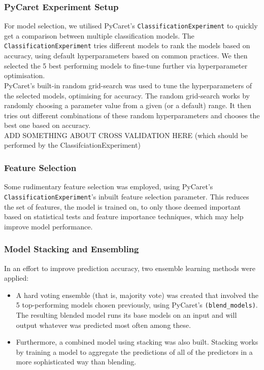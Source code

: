 \documentclass[a4paper,12pt]{article}
\begin{document}
\subsubsection{PyCaret Experiment Setup}
For model selection, we utilised PyCaret's \texttt{ClassificationExperiment} to quickly get a 
comparison between multiple classification models. The \texttt{ClassificationExperiment} tries 
different models to rank the models based on accuracy, using default hyperparameters based on common practices. 
We then selected the 5 best performing models to fine-tune further via hyperparameter optimisation. 
\\
PyCaret’s built-in random grid-search was used to tune the hyperparameters of the selected models, 
optimising for accuracy. The random grid-search works by 
randomly choosing a parameter value from a given (or a default) range. It then tries out different combinations
of these random hyperparameters and chooses the best one based on accuracy.
\\
ADD SOMETHING ABOUT CROSS VALIDATION HERE (which should be performed by the ClassifciationExperiment)


\subsubsection{Feature Selection}
Some rudimentary feature selection was employed, using PyCaret's \texttt{ClassificationExperiment}'s inbuilt
feature selection parameter. This reduces the set of features, the model is trained on, to only those deemed 
important based on statistical tests and feature importance techniques, which may help improve model 
performance.

\subsubsection{Model Stacking and Ensembling}
In an effort to improve prediction accuracy, two ensemble learning methods were applied:
\begin{itemize}
    \item A hard voting ensemble (that is, majority vote) was created that involved 
    the 5 top-performing models chosen previously, using PyCaret's \texttt{(blend\_models)}. 
    The resulting blended model runs its base models on an input
    and will output whatever was predicted most often among these.
    \item Furthermore, a combined model using stacking was also built. 
    Stacking works by training a model to aggregate the predictions of all of the predictors in a more
    sophisticated way than blending.
\end{itemize} 
\end{document}
